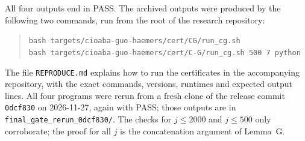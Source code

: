 \documentclass[11pt]{amsart}
\theoremstyle{plain}
\theoremstyle{definition}
\theoremstyle{remark}
\numberwithin{equation}{section}
\newcommand{\ttt}[1]{\texttt{#1}}
\begin{document}
All four outputs end in PASS. The archived outputs were produced by the following two commands, run from the root of the research repository:
\begin{quote}
\small
\ttt{bash targets/cioaba-guo-haemers/cert/CG/run\_cg.sh}\\
\ttt{bash targets/cioaba-guo-haemers/cert/C-G/run\_cg.sh 500 7 python}
\end{quote}
The file \ttt{REPRODUCE.md} explains how to run the certificates in the accompanying repository, with the exact commands, versions, runtimes and expected output lines. All four programs were rerun from a fresh clone of the release commit \ttt{0dcf830} on 2026-11-27, again with PASS; those outputs are in \nolinkurl{final_gate_rerun_0dcf830/}. The checks for \(j\le2000\) and \(j\le500\) only corroborate; the proof for all \(j\) is the concatenation argument of Lemma~G.
\end{document}
